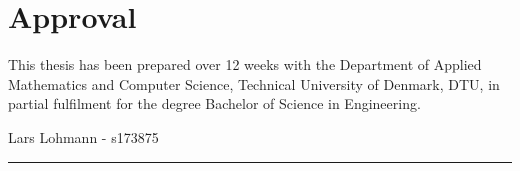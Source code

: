 \section*{Approval}
This thesis has been prepared over 12 weeks with the Department of Applied Mathematics and Computer Science, Technical University of Denmark, DTU, in partial fulfilment for the degree Bachelor of Science in Engineering.


\vfill

\begin{center}


Lars Lohmann - s173875 \rule{50mm}{0.4pt}

\end{center}

\vfill

\newpage